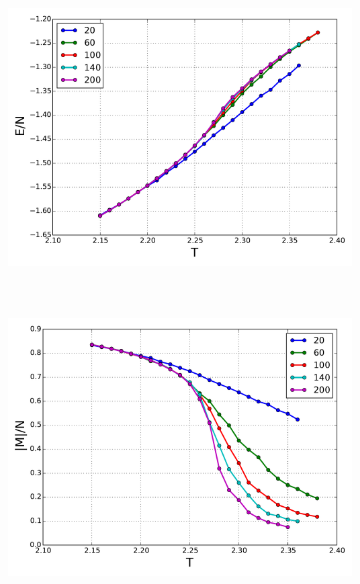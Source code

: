 \begin{figure}[H]
    \centering
    \begin{subfigure}{0.5\textwidth}
        \centering
        \includegraphics[width=\linewidth]{result/bilder/Tc/e-Tc}
        \caption{}
    \end{subfigure}%
    ~ 
    \begin{subfigure}{0.5\textwidth}
        \centering
        \includegraphics[width=\linewidth]{result/bilder/Tc/m-Tc}
        \caption{}
    \end{subfigure}
    \begin{subfigure}{0.5\textwidth}
    	\centering

\end{subfigure}
\end{figure}
